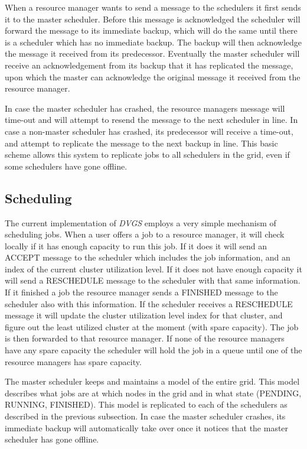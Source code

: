 \documentclass{article}
\begin{document}
When a resource manager wants to send a message to the schedulers it first sends it to the master scheduler. Before this message is acknowledged the scheduler will forward the message to its immediate backup, which will do the same until there is a scheduler which has no immediate backup. The backup will then acknowledge the message it received from its predecessor. Eventually the master scheduler will receive an acknowledgement from its backup that it has replicated the message, upon which the master can acknowledge the original message it received from the resource manager. 

In case the master scheduler has crashed, the resource managers message will time-out and will attempt to resend the message to the next scheduler in line. In case a non-master scheduler has crashed, its predecessor will receive a time-out, and attempt to replicate the message to the next backup in line. This basic scheme allows this system to replicate jobs to all schedulers in the grid, even if some schedulers have gone offline.

\subsection{Scheduling}

The current implementation of \textit{DVGS} employs a very simple mechanism of scheduling jobs. When a user offers a job to a resource manager, it will check locally if it has enough capacity to run this job. If it does it will send an ACCEPT message to the scheduler which includes the job information, and an index of the current cluster utilization level. If it does not have enough capacity it will send a RESCHEDULE message to the scheduler with that same information. If it finished a job the resource manager sends a FINISHED message to the scheduler also with this information. If the scheduler receives a RESCHEDULE message it will update the cluster utilization level index for that cluster, and figure out the least utilized cluster at the moment (with spare capacity). The job is then forwarded to that resource manager. If none of the resource managers have any spare capacity the scheduler will hold the job in a queue until one of the resource managers has spare capacity.

The master scheduler keeps and maintains a model of the entire grid. This model describes what jobs are at which nodes in the grid and in what state (PENDING, RUNNING, FINISHED). This model is replicated to each of the schedulers as described in the previous subsection. In case the master scheduler crashes, its immediate backup will automatically take over once it notices that the master scheduler has gone offline.
\end{document}

